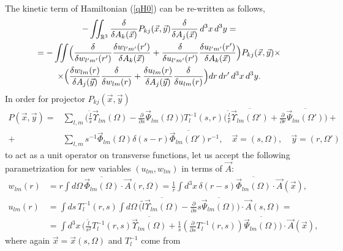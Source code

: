 \documentclass[12pt]{article}
\newcommand{\pl}{\partial}
\newcommand{\ol}{\overline}
\newcommand{\RR}{\mathbb{R}}
\begin{document}
	The kinetic term of Hamiltonian
(\ref{qH0})
	can be re-written as follows,
\begin{multline}
\label{qHkin}
    - \iint_{\RR^{3}} \frac{\delta}{\delta A_{k}(\vec{x})}
	P_{kj}(\vec{x},\vec{y}) \frac{\delta}{\delta A_{j}(\vec{x})}
	\, d^{3}x\, d^{3}y =\\
    = -\iint\Bigl(
\frac{\delta}{\delta w_{l'm'}(r')} \frac{\delta w_{l'm'}(r')}{
    \delta A_{k}(\vec{x})}
+\frac{\delta}{\delta u_{l'm'}(r')}\frac{\delta u_{l'm'}(r')}{
    \delta A_{k}(\vec{x})} \Bigr) P_{kj}(\vec{x},\vec{y}) \times \\
    \times \Bigl(
\frac{\delta w_{lm}(r)}{\delta A_{j}(\vec{y})}
    \frac{\delta}{\delta w_{lm}(r)}
+\frac{\delta u_{lm}(r)}{\delta A_{j}(\vec{y})} \frac{\delta}{\delta u_{lm}(r)}
    \Bigr) dr\, dr'\, d^{3}x\, d^{3}y .
\end{multline}
	In order for projector
$ P_{kj}(\vec{x},\vec{y}) $
\begin{align*}
    P(\vec{x},\vec{y}) =& \sum_{l,m}
\bigl(\frac{\tilde{l}}{s} \vec{\Upsilon}_{lm}(\Omega)
    - \frac{\pl}{\pl s} \vec{\Psi}_{lm}(\Omega) \bigr) T^{-1}_{l}(s,r)
\bigl(\frac{\tilde{l}}{r} \ol{\vec{\Upsilon}_{lm}(\Omega')}
    + \frac{\pl}{\pl r} \ol{\vec{\Psi}_{lm}(\Omega')} \bigr) +\\
 +& \sum_{l,m} s^{-1} \vec{\Phi}_{lm}(\Omega) \delta(s-r)
	\ol{\vec{\Phi}_{lm}(\Omega')} r^{-1} ,
    \quad \vec{x} = (s,\Omega) , \quad \vec{y} = (r, \Omega')
\end{align*}
	to act as a unit operator on transverse functions,
	let us accept the following parametrization for new variables
$ (u_{lm}, w_{lm}) $
	in terms of 
$ \vec{A} $:
\begin{align}
\label{dphiA}
    w_{lm}(r) &= r\int d\Omega \, \ol{\vec{\Phi}_{lm}(\Omega)}\cdot
	\vec{A}(r,\Omega)
	= \frac{1}{r} \int d^{3}x \, \delta(r-s) \ol{\vec{\Phi}_{lm}(\Omega)} \cdot
	    \vec{A}(\vec{x}) , \\
\nonumber
    u_{lm}(r) &= \int ds \, T_{l}^{-1}(r,s) \int d\Omega \,\bigl(
	\tilde{l}\ol{\vec{\Upsilon}_{lm}(\Omega)}
	    -\frac{\pl}{\pl s}s\ol{\vec{\Psi}_{lm}(\Omega)}
	\bigr) \cdot \vec{A}(s,\Omega) =\\
\label{duA}
    &= \int d^{3}x \,
	\bigl(\frac{\tilde{l}}{s^{2}}T_{l}^{-1}(r,s)
	    \ol{\vec{\Upsilon}_{lm}(\Omega)}
+\frac{1}{s}(\frac{\pl}{\pl s}T_{l}^{-1}(r,s))\ol{\vec{\Psi}_{lm}(\Omega)}
	\bigr) \cdot \vec{A}(\vec{x}) ,
\end{align}
	where again
$ \vec{x} = \vec{x}(s,\Omega) $
    and
$ T_{l}^{-1} $
    come from
\end{document}
